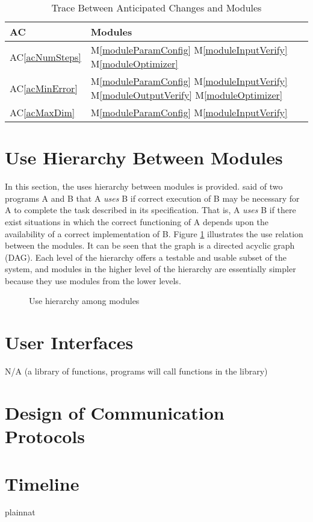 \documentclass[12pt, titlepage]{article}
\newcommand{\acref}[1]{AC\ref{#1}}
\newcommand{\mref}[1]{M\ref{#1}}
\begin{document}
\begin{table}[H]
\centering
\begin{tabular}{p{} p{}}
\toprule
\textbf{AC} & \textbf{Modules}\\
\midrule
\acref{acNumSteps} & \mref{moduleParamConfig} \mref{moduleInputVerify} \mref{moduleOptimizer} \\
\acref{acMinError} & \mref{moduleParamConfig} \mref{moduleInputVerify} 
\mref{moduleOutputVerify} \mref{moduleOptimizer}\\
\acref{acMaxDim} & \mref{moduleParamConfig} \mref{moduleInputVerify}\\
\bottomrule
\end{tabular}
\caption{Trace Between Anticipated Changes and Modules}
\label{TblACT}
\end{table}

\section{Use Hierarchy Between Modules} \label{SecUse}

In this section, the uses hierarchy between modules is
provided. \citet{Parnas1978} said of two programs A and B that A {\em uses} B if
correct execution of B may be necessary for A to complete the task described in
its specification. That is, A {\em uses} B if there exist situations in which
the correct functioning of A depends upon the availability of a correct
implementation of B.  Figure \ref{FigUH} illustrates the use relation between
the modules. It can be seen that the graph is a directed acyclic graph
(DAG). Each level of the hierarchy offers a testable and usable subset of the
system, and modules in the higher level of the hierarchy are essentially simpler
because they use modules from the lower levels.

\begin{figure}[H]
\centering
\caption{Use hierarchy among modules}
\label{FigUH}
\end{figure}


\section{User Interfaces}
N/A (a library of functions, programs will call functions in the library)

\section{Design of Communication Protocols}


\section{Timeline}



 {plainnat}


\newpage{}
\end{document}
